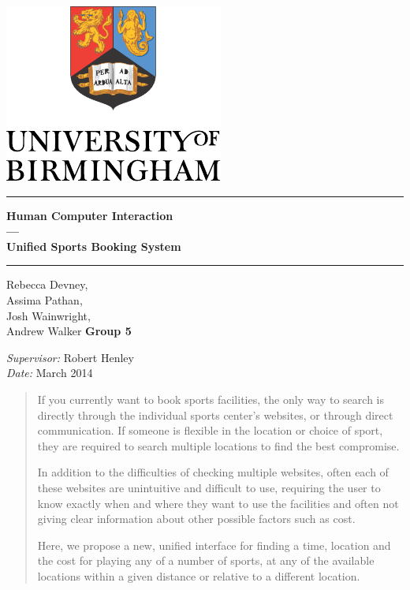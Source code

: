 \begin{titlepage}
	\begin{center}
	\vspace*{\fill}

	\centering
	\includegraphics[scale=1.0]{Logo.pdf}
	\vfill

	\hrule
	{\LARGE\bf Human Computer Interaction \\
		--- \\
		Unified Sports Booking System\\[0.4cm]}
	\hrule

	\vfill

	\vfill
		Rebecca Devney,\\
		Assima Pathan,\\
		Josh Wainwright,\\
		Andrew Walker
	\vfill
		\textbf{Group 5}
	\vfill

	\vfill
	\textit{Supervisor:} Robert Henley \\
	\vfill
	\textit{Date:} March 2014
	\vfill
	\vfill

	\begin{abstract}
		If you currently want to book sports facilities, the only way to search
		is directly through the individual sports center's websites, or through
		direct communication. If someone is flexible in the location or choice
		of sport, they are required to search multiple locations to find the
		best compromise.

		In addition to the difficulties of checking multiple websites, often
		each of these websites are unintuitive and difficult to use, requiring
		the user to know exactly when and where they want to use the facilities
		and often not giving clear information about other possible factors
		such as cost.

		Here, we propose a new, unified interface for finding a time, location
		and the cost for playing any of a number of sports, at any of the
		available locations within a given distance or relative to a different
		location.
	\end{abstract}

	\end{center}
\end{titlepage}



